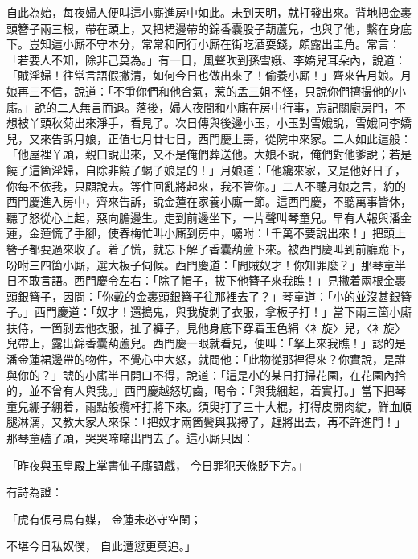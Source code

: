 自此為始，每夜婦人便叫這小廝進房中如此。未到天明，就打發出來。背地把金裹頭簪子兩三根，帶在頭上，又把裙邊帶的錦香囊股子葫蘆兒，也與了他，繫在身底下。豈知這小廝不守本分，常常和同行小廝在街吃酒耍錢，頗露出圭角。常言：「若要人不知，除非己莫為。」有一日，風聲吹到孫雪娥、李嬌兒耳朵內，說道：「賊淫婦！往常言語假撇清，如何今日也做出來了！偷養小廝！」齊來告月娘。月娘再三不信，說道：「不爭你們和他合氣，惹的孟三姐不怪，只說你們擠撮他的小廝。」說的二人無言而退。落後，婦人夜間和小廝在房中行事，忘記關廚房門，不想被丫頭秋菊出來淨手，看見了。次日傳與後邊小玉，小玉對雪娥說，雪娥同李嬌兒，又來告訴月娘，正值七月廿七日，西門慶上壽，從院中來家。二人如此這般：「他屋裡丫頭，親口說出來，又不是俺們葬送他。大娘不說，俺們對他爹說；若是饒了這箇淫婦，自除非饒了蝎子娘是的！」月娘道：「他纔來家，又是他好日子，你每不依我，只顧說去。等住回亂將起來，我不管你。」二人不聽月娘之言，約的西門慶進入房中，齊來告訴，說金蓮在家養小廝一節。這西門慶，不聽萬事皆休，聽了怒從心上起，惡向膽邊生。走到前邊坐下，一片聲叫琴童兒。早有人報與潘金蓮，金蓮慌了手腳，使春梅忙叫小廝到房中，囑咐：「千萬不要說出來！」把頭上簪子都要過來收了。着了慌，就忘下解了香囊葫蘆下來。被西門慶叫到前廳跪下，吩咐三四箇小廝，選大板子伺候。西門慶道：「問賊奴才！你知罪麼？」那琴童半日不敢言語。西門慶令左右：「除了帽子，拔下他簪子來我瞧！」見撇着兩根金裹頭銀簪子，因問：「你戴的金裹頭銀簪子往那裡去了？」琴童道：「小的並沒甚銀簪子。」西門慶道：「奴才！還搗鬼，與我旋剝了衣服，拿板子打！」當下兩三箇小廝扶侍，一箇剝去他衣服，扯了褲子，見他身底下穿着玉色絹〈衤旋〉兒，〈衤旋〉兒帶上，露出錦香囊葫蘆兒。西門慶一眼就看見，便叫：「拏上來我瞧！」認的是潘金蓮裙邊帶的物件，不覺心中大怒，就問他：「此物從那裡得來？你實說，是誰與你的？」諕的小廝半日開口不得，說道：「這是小的某日打掃花園，在花園內拾的，並不曾有人與我。」西門慶越怒切齒，喝令：「與我綑起，着實打。」當下把琴童兒綳子綳着，雨點般欖杆打將下來。須臾打了三十大棍，打得皮開肉綻，鮮血順腿淋漓，又教大家人來保：「把奴才兩箇鬢與我撏了，趕將出去，再不許進門！」那琴童磕了頭，哭哭啼啼出門去了。這小廝只因：

「昨夜與玉皇殿上掌書仙子廝調戲，  今日罪犯天條貶下方。」

有詩為證：

「虎有倀弓鳥有媒，  金蓮未必守空閨；

不堪今日私奴僕，  自此遭愆更莫追。」

